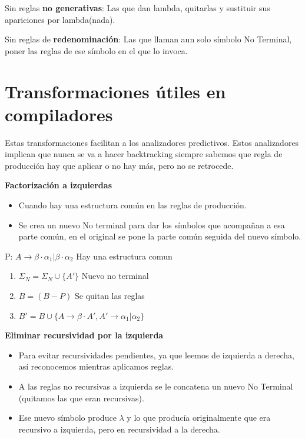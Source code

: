 \documentclass[12pt, twoside, openright]{report} %
\begin{document}
Sin reglas \textbf{no generativas}: Las que dan lambda, quitarlas y
sustituir sus apariciones por lambda(nada).

Sin reglas de \textbf{redenominación}: Las que llaman aun solo símbolo
No Terminal, poner las reglas de ese símbolo en el que lo invoca.


\section{Transformaciones útiles en compiladores}

Estas transformaciones facilitan a los analizadores predictivos. Estos
analizadores implican que nunca se va a hacer backtracking siempre
sabemos que regla de producción hay que aplicar o no hay más, pero no se
retrocede.

\textbf{Factorización a izquierdas}

\begin{itemize}
	\item Cuando hay una estructura común en las reglas de producción.
	\item Se crea un nuevo No terminal para dar los símbolos que acompañan a esa
	      parte común, en el original se pone la parte común seguida del nuevo
	      símbolo.
\end{itemize}

P: $A \rightarrow \beta \cdot \alpha_1 | \beta \cdot \alpha_2$ Hay una estructura comun

\begin{enumerate}
	\item $\Sigma_N = \Sigma_N \cup \{ A'\}$ Nuevo no terminal
	\item $B = (B - P)$ Se quitan las reglas
	\item $B' = B \cup \{ A \rightarrow \beta \cdot A',{ } A' \rightarrow \alpha_1 | \alpha_2 \}$
\end{enumerate}

\textbf{Eliminar recursividad por la izquierda}

\begin{itemize}
	\item Para evitar recursividades pendientes, ya que leemos de izquierda a
	      derecha, así reconocemos mientras aplicamos reglas.
	\item A las reglas no recursivas a izquierda se le concatena un nuevo No
	      Terminal (quitamos las que eran recursivas).
	\item Ese nuevo símbolo produce \(\lambda\) y lo que producía originalmente
	      que era recursivo a izquierda, pero en recursividad a la derecha.
\end{itemize}
\end{document}
